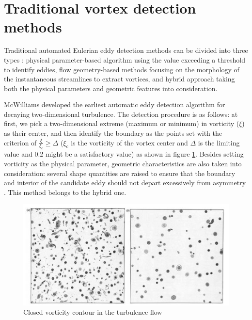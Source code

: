 \section{Traditional vortex detection methods}\label{Eulerian representation}\label{Eulerian methods}

Traditional automated Eulerian eddy detection methods can be divided into three types \cite{nencioli2010vector}: physical parameter-based algorithm using the value exceeding a threshold to identify eddies, flow geometry-based methods focusing on the morphology of the instantaneous streamlines to extract vortices, and hybrid approach taking both the physical parameters and geometric features into consideration. 

McWilliams developed the earliest automatic eddy detection algorithm for decaying two-dimensional turbulence. The detection procedure is as follows: at first, we pick a two-dimensional extreme (maximum or minimum) in vorticity ($\xi$) as their center, and then identify the boundary as the points set with the criterion of $\frac{\xi}{\xi_c} \geqslant \Delta$ (${\xi_c}$ is the vorticity of the vortex center and $\Delta$ is the limiting value and 0.2 might be a satisfactory value) as shown in figure \ref{Closed vorticity contour in the turbulence flow}. Besides setting vorticity as the physical parameter, geometric characteristics are also taken into consideration: several shape quantities are raised to ensure that the boundary and interior of the candidate eddy should not depart excessively from asymmetry \cite{mcwilliams1990vortices}. This method belongs to the hybrid one.

\begin{figure}[ht]
  \centering
  \includegraphics[width=15cm]{chapter/figure/closed vorticity contour in the turbulence flow.png}
  \caption
  {Closed vorticity contour in the turbulence flow 
  \cite{mcwilliams1990vortices} }
  \label{Closed vorticity contour in the turbulence flow}
\end{figure}

